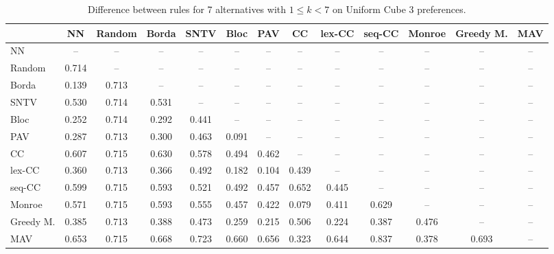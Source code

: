 
\begin{table*}[htbp]
\centering
\begin{tabular}{lcccccccccccc}
\toprule
 & NN & Random & Borda & SNTV & Bloc & PAV & CC & lex-CC & seq-CC & Monroe & Greedy M. & MAV \\
\midrule
NN & -- & -- & -- & -- & -- & -- & -- & -- & -- & -- & -- & -- \\
Random & \cellcolor{blue!71} 0.714 & -- & -- & -- & -- & -- & -- & -- & -- & -- & -- & -- \\
Borda & \cellcolor{blue!13} 0.139 & \cellcolor{blue!71} 0.713 & -- & -- & -- & -- & -- & -- & -- & -- & -- & -- \\
SNTV & \cellcolor{blue!53} 0.530 & \cellcolor{blue!71} 0.714 & \cellcolor{blue!53} 0.531 & -- & -- & -- & -- & -- & -- & -- & -- & -- \\
Bloc & \cellcolor{blue!25} 0.252 & \cellcolor{blue!71} 0.714 & \cellcolor{blue!29} 0.292 & \cellcolor{blue!44} 0.441 & -- & -- & -- & -- & -- & -- & -- & -- \\
PAV & \cellcolor{blue!28} 0.287 & \cellcolor{blue!71} 0.713 & \cellcolor{blue!30} 0.300 & \cellcolor{blue!46} 0.463 & \cellcolor{blue!9} 0.091 & -- & -- & -- & -- & -- & -- & -- \\
CC & \cellcolor{blue!60} 0.607 & \cellcolor{blue!71} 0.715 & \cellcolor{blue!63} 0.630 & \cellcolor{blue!57} 0.578 & \cellcolor{blue!49} 0.494 & \cellcolor{blue!46} 0.462 & -- & -- & -- & -- & -- & -- \\
lex-CC & \cellcolor{blue!36} 0.360 & \cellcolor{blue!71} 0.713 & \cellcolor{blue!36} 0.366 & \cellcolor{blue!49} 0.492 & \cellcolor{blue!18} 0.182 & \cellcolor{blue!10} 0.104 & \cellcolor{blue!43} 0.439 & -- & -- & -- & -- & -- \\
seq-CC & \cellcolor{blue!59} 0.599 & \cellcolor{blue!71} 0.715 & \cellcolor{blue!59} 0.593 & \cellcolor{blue!52} 0.521 & \cellcolor{blue!49} 0.492 & \cellcolor{blue!45} 0.457 & \cellcolor{blue!65} 0.652 & \cellcolor{blue!44} 0.445 & -- & -- & -- & -- \\
Monroe & \cellcolor{blue!57} 0.571 & \cellcolor{blue!71} 0.715 & \cellcolor{blue!59} 0.593 & \cellcolor{blue!55} 0.555 & \cellcolor{blue!45} 0.457 & \cellcolor{blue!42} 0.422 & \cellcolor{blue!7} 0.079 & \cellcolor{blue!41} 0.411 & \cellcolor{blue!62} 0.629 & -- & -- & -- \\
Greedy M. & \cellcolor{blue!38} 0.385 & \cellcolor{blue!71} 0.713 & \cellcolor{blue!38} 0.388 & \cellcolor{blue!47} 0.473 & \cellcolor{blue!25} 0.259 & \cellcolor{blue!21} 0.215 & \cellcolor{blue!50} 0.506 & \cellcolor{blue!22} 0.224 & \cellcolor{blue!38} 0.387 & \cellcolor{blue!47} 0.476 & -- & -- \\
MAV & \cellcolor{blue!65} 0.653 & \cellcolor{blue!71} 0.715 & \cellcolor{blue!66} 0.668 & \cellcolor{blue!72} 0.723 & \cellcolor{blue!66} 0.660 & \cellcolor{blue!65} 0.656 & \cellcolor{blue!32} 0.323 & \cellcolor{blue!64} 0.644 & \cellcolor{blue!83} 0.837 & \cellcolor{blue!37} 0.378 & \cellcolor{blue!69} 0.693 & -- \\
\bottomrule
\end{tabular}

\caption{Difference between rules for 7 alternatives with $1 \leq k < 7$ on Uniform Cube 3 preferences.}
\label{tab:rule_distance_heatmap-m=[7]-pref_dist=euclidean__args__dimensions=3_-_space=uniform_cube}
\end{table*}
    